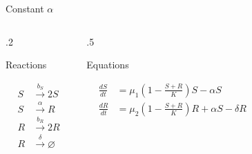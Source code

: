 \documentclass[final]{beamer}
\newlength{\sepwid}
\newlength{\onecolwid}
\begin{document}
\begin{frame}[t]
\begin{block}
\begin{columns}[t]
\begin{column}{\onecolwid}
\begin{block}{Constant $\alpha$}
  \begin{columns}[t]
    \begin{column}{.2\onecolwid}
      \begin{center}
        Reactions
      \end{center}
      \begin{align*}
        S & \stackrel{b_S}{\rightarrow} 2S \\
        S & \stackrel{\alpha}{\rightarrow}  R \\
        R & \stackrel{b_R}{\rightarrow} 2R \\
        R & \stackrel{\delta}{\rightarrow} \varnothing
      \end{align*}
    \end{column}
      \vrule
    \begin{column}{.5\onecolwid}
      \begin{center}
        Equations
      \end{center}

      \begin{align*}
        \frac{dS}{dt}& = \mu_1 \left(1 - \frac{S + R}{K}\right)S - \alpha S \\[0.5ex]
        \frac{dR}{dt}& = \mu_2 \left(1 - \frac{S + R}{K}\right)R + \alpha S - \delta R
      \end{align*}

      \vspace{.9\baselineskip}
      \vspace{.9\baselineskip}
    \end{column}
  \end{columns}

  \end{block}
\end{column}

\vrule width 5pt
\begin{column}{\sepwid}\end{column} %

\begin{column}{\onecolwid}


\end{column}
\end{columns}
\end{block}
\end{frame}
\end{document}
